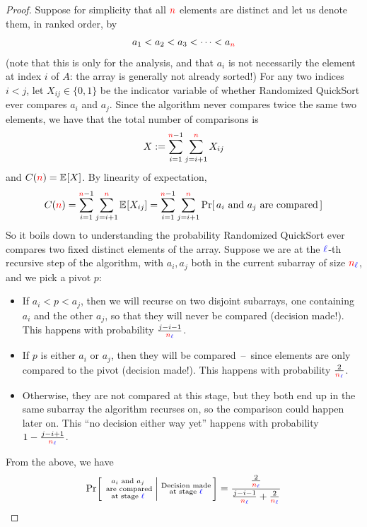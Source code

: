 \begin{proof}
    Suppose for simplicity that all ${\textcolor{red}{n}}$ elements are distinct and let us denote them, in ranked order, by
    \[
    a_1 < a_2 < a_3 < \dots < a_{\textcolor{red}{n}}
    \]
    (note that this is only for the analysis, and that $a_i$ is not necessarily the element at index $i$ of $A$: the array is generally not already sorted!)
    For any two indices $i < j$, let $X_{ij}\in\{0,1\}$ be the indicator variable of whether Randomized QuickSort ever compares $a_i$ and $a_j$. Since the algorithm never compares twice the same two elements, we have that the total number of comparisons is 
    \[
        X := \sum_{i=1}^{{\textcolor{red}{n}}-1} \sum_{j=i+1}^{\textcolor{red}{n}} X_{ij}
    \]
    and $C(\ns) = \bEE{X}$. By linearity of expectation,
    \[
        C(\ns) = \sum_{i=1}^{\ns-1} \sum_{j=i+1}^\ns \bEE{X_{ij}}
        = \sum_{i=1}^{\ns-1} \sum_{j=i+1}^\ns \probaOf{a_i\text{ and } a_j \text{ are compared}}
    \]
    So it boils down to understanding the probability Randomized QuickSort ever compares two fixed distinct elements of the array. Suppose we are at the ${\textcolor{blue}{\ell}}$-th recursive step of the algorithm, with $a_i,a_j$ both in the current subarray of size ${\textcolor{red}{n}}_{\textcolor{blue}{\ell}}$, and we pick a pivot $p$:
    \begin{itemize}
        \item If $a_i < p < a_j$, then we will recurse on two disjoint subarrays, one containing $a_i$ and the other $a_j$, so that they will never be compared (decision made!). This happens with probability $\frac{j-i-1}{{\textcolor{red}{n}}_{\textcolor{blue}{\ell}}}$.
        \item If $p$ is either $a_i$ or $a_j$, then they will be compared~--~since elements are only compared to the pivot (decision made!). This happens with probability $\frac{2}{{\textcolor{red}{n}}_{\textcolor{blue}{\ell}}}$.
        \item Otherwise, they are not compared at this stage, but they both end up in the same subarray the algorithm recurses on, so the comparison could happen later on. This ``no decision either way yet'' happens with probability $1-\frac{j-i+1}{{\textcolor{red}{n}}_{\textcolor{blue}{\ell}}}$.
    \end{itemize}
    From the above, we have
    \[
        \probaCond{\substack{a_i\text{ and } a_j\\\text{ are compared}\\\text{at stage }{\blue{\ell}}} }{\substack{\text{Decision made}\\\text{at stage }{\blue{\ell}}}}
        = \frac{\frac{2}{\ns_{\blue{\ell}}}}{\frac{j-i-1}{\ns_{\blue{\ell}}}+\frac{2}{\ns_{\blue{\ell}}}}
\]
\end{proof}

